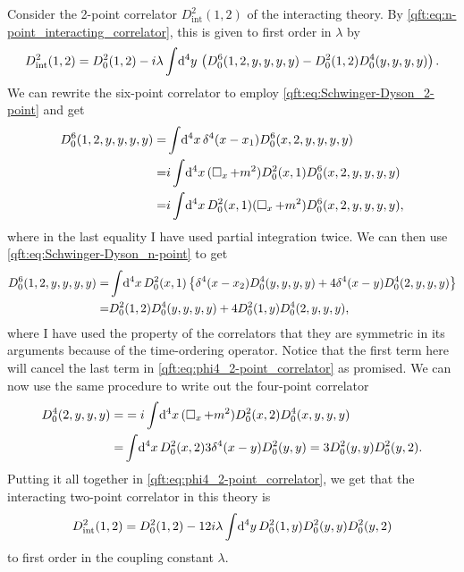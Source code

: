 \documentclass[../main.tex]{subfiles}
\begin{document}
Consider the 2-point correlator \(D_{\text{int}}^2(1,2)\) of the interacting theory.
By \cref{qft:eq:n-point_interacting_correlator}, this is given to first order in \(\lambda\) by
\begin{equation}
  \label{qft:eq:phi4_2-point_correlator}
  D_{\text{int}}^2(1,2) = D_0^2(1,2) - i\lambda \int \!\mathrm{d}^4y\, \left(D_0^6(1,2,y,y,y,y) - D_0^2(1,2)D_0^4(y,y,y,y)\right).
\end{equation}
We can rewrite the six-point correlator to employ \cref{qft:eq:Schwinger-Dyson_2-point} and get
\begin{align}
  \nonumber
  D_0^6(1,2,y,y,y,y) = & \int \!\mathrm{d}^4x\, \delta^4(x-x_1) D_0^6(x,2,y,y,y,y)            \\
  \nonumber
  =                    & i\int \!\mathrm{d}^4x\, (\operatorname{\Box}_x + m^2) D^2_0(x,1) D_0^6(x,2,y,y,y,y)  \\
  =                    & i\int \!\mathrm{d}^4x\, D^2_0(x,1) (\operatorname{\Box}_x + m^2) D_0^6(x,2,y,y,y,y),
\end{align}
where in the last equality I have used partial integration twice.
We can then use \cref{qft:eq:Schwinger-Dyson_n-point} to get
\begin{align}
  \nonumber
  D_0^6(1,2,y,y,y,y) = & \int \!\mathrm{d}^4x\, D^2_0(x,1) \left\{\delta^4(x-x_2) D_0^4(y,y,y,y) + 4\delta^4(x-y)D_0^4(2,y,y,y)\right\} \\
  =                    & D_0^2(1,2) D_0^4(y,y,y,y) + 4 D_0^2(1,y)D_0^4(2,y,y,y),
\end{align}
where I have used the property of the correlators that they are symmetric in its arguments because of the time-ordering operator.
Notice that the first term here will cancel the last term in \cref{qft:eq:phi4_2-point_correlator} as promised.
We can now use the same procedure to write out the four-point correlator
\begin{align}
  \nonumber
  D_0^4(2,y,y,y) = & = i\int \!\mathrm{d}^4x\, (\operatorname{\Box}_x + m^2) D_0^2(x,2) D_0^4(x,y,y,y)                      \\
  =                & \int \!\mathrm{d}^4x\, D_0^2(x,2) 3 \delta^4(x-y) D_0^2(y,y) = 3D_0^2(y,y) D_0^2(y,2).
\end{align}
Putting it all together in \cref{qft:eq:phi4_2-point_correlator}, we get that the interacting two-point correlator in this theory is
\begin{equation}
  \label{qft:eq:phi4_2-point_correlator}
  D_{\text{int}}^2(1, 2) = D_0^2(1, 2) - 12 i \lambda \int \!\mathrm{d}^4y\, D_0^2(1, y) D_0^2(y, y) D_0^2(y, 2)
\end{equation}
to first order in the coupling constant \(\lambda\).
\end{document}
